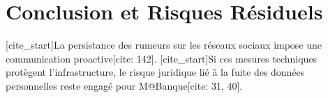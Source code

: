 \documentclass[a4paper,11pt]{article}
\begin{document}
\section{Conclusion et Risques Résiduels}
[cite_start]La persistance des rumeurs sur les réseaux sociaux impose une communication proactive[cite: 142]. [cite_start]Si ces mesures techniques protègent l'infrastructure, le risque juridique lié à la fuite des données personnelles reste engagé pour M@Banque[cite: 31, 40].
\end{document}
